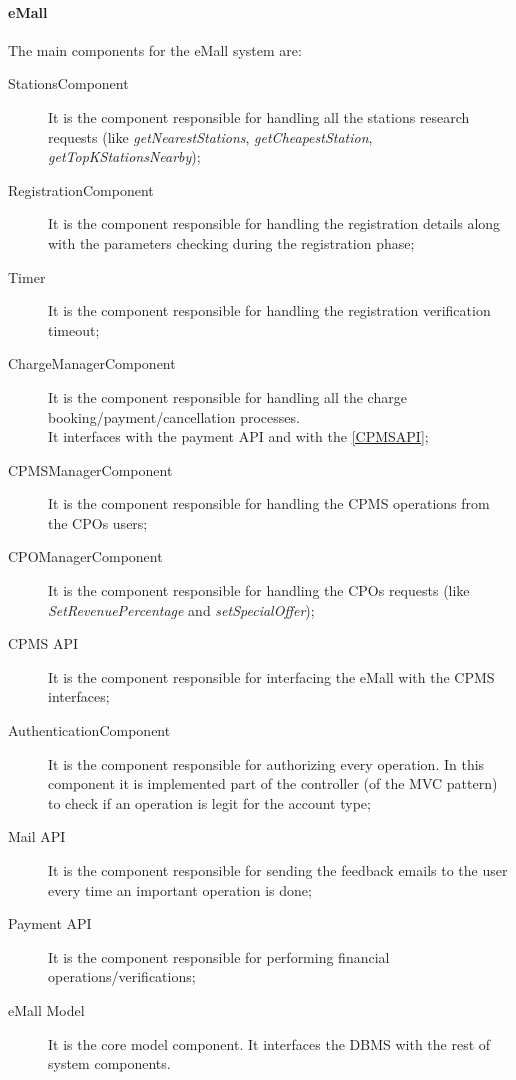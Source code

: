 \paragraph{\textbf{\ac{eMall}}}
The main components for the \ac{eMall} system are:
\begin{description}
    \item [\label{StationsComponent}StationsComponent] It is the component responsible for handling all the stations research requests (like \textit{getNearestStations}, \textit{getCheapestStation}, \textit{getTopKStationsNearby});
    \item [\label{RegistrationComponent}RegistrationComponent] It is the component responsible for handling the registration details along with the parameters checking during the registration phase;
    \item [\label{Timer}Timer] It is the component responsible for handling the registration verification timeout;
    \item [\label{ChargeManagerComponent}ChargeManagerComponent] It is the component responsible for handling all the charge booking/payment/cancellation processes. \\ It interfaces with the payment \ac{API} and with the \ref{CPMSAPI};
    \item [\label{CPMSManagerComponent}CPMSManagerComponent] It is the component responsible for handling the \ac{CPMS} operations from the \acp{CPO} users;
    \item [\label{CPOManagerComponent}CPOManagerComponent] It is the component responsible for handling the \acp{CPO} requests (like \textit{SetRevenuePercentage} and \textit{setSpecialOffer});
    \item [\label{CPMSAPI}CPMS API] It is the component responsible for interfacing the \ac{eMall} with the CPMS interfaces;
    \item [\label{AuthenticationComponent}AuthenticationComponent] It is the component responsible for authorizing every operation. In this component it is implemented part of the controller (of the \ac{MVC} pattern) to check if an operation is legit for the account type;
    \item [\label{MailAPI}Mail API] It is the component responsible for sending the feedback emails to the user every time an important operation is done;
    \item [\label{PaymentAPI}Payment API] It is the component responsible for performing financial operations/verifications;
    \item [\label{eMallModel}eMall Model] It is the core model component. It interfaces the \ac{DBMS} with the rest of system components.
\end{description}
\clearpage
